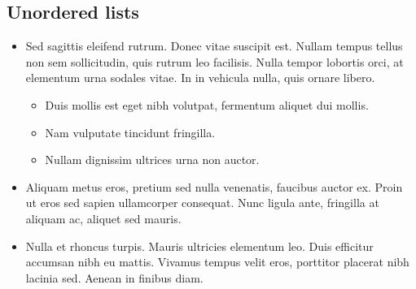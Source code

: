 \documentclass[letterpaper,10pt,english]{sphinxmanual}
\begin{document}
\subsection{Unordered lists}
\label{\detokenize{specimen:unordered-lists}}\begin{itemize}
\item {} 
Sed sagittis eleifend rutrum. Donec vitae suscipit est. Nullam tempus
tellus non sem sollicitudin, quis rutrum leo facilisis. Nulla tempor
lobortis orci, at elementum urna sodales vitae. In in vehicula nulla,
quis ornare libero.
\begin{itemize}
\item {} 
Duis mollis est eget nibh volutpat, fermentum aliquet dui mollis.

\item {} 
Nam vulputate tincidunt fringilla.

\item {} 
Nullam dignissim ultrices urna non auctor.

\end{itemize}

\item {} 
Aliquam metus eros, pretium sed nulla venenatis, faucibus auctor ex.
Proin ut eros sed sapien ullamcorper consequat. Nunc ligula ante,
fringilla at aliquam ac, aliquet sed mauris.

\item {} 
Nulla et rhoncus turpis. Mauris ultricies elementum leo. Duis
efficitur accumsan nibh eu mattis. Vivamus tempus velit eros,
porttitor placerat nibh lacinia sed. Aenean in finibus diam.

\end{itemize}
\end{document}
